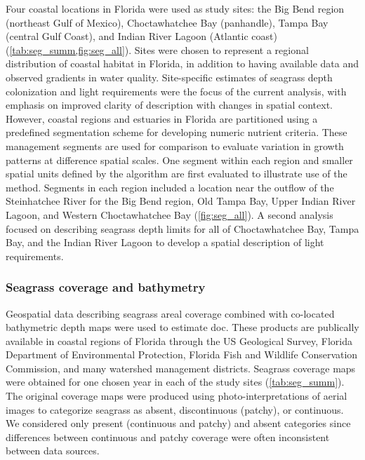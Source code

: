\documentclass[letterpaper,12pt,oneside]{article}\usepackage[]{graphicx}\usepackage[]{color}
\begin{document}
Four coastal locations in Florida were used as study sites: the Big Bend region (northeast Gulf of Mexico), Choctawhatchee Bay (panhandle), Tampa Bay (central Gulf Coast), and Indian River Lagoon (Atlantic coast) (\cref{tab:seg_summ,fig:seg_all}).  Sites were chosen to represent a regional distribution of coastal habitat in Florida, in addition to having available data and observed gradients in water quality. Site-specific estimates of seagrass depth colonization and light requirements were the focus of the current analysis, with emphasis on improved clarity of description with changes in spatial context.  However, coastal regions and estuaries in Florida are partitioned using a predefined segmentation scheme for developing numeric nutrient criteria.  These management segments are used for comparison to evaluate variation in growth patterns at difference spatial scales.  One segment within each region and smaller spatial units defined by the algorithm are first evaluated to illustrate use of the method.  Segments in each region included a location near the outflow of the Steinhatchee River for the Big Bend region, Old Tampa Bay, Upper Indian River Lagoon, and Western Choctawhatchee Bay (\cref{fig:seg_all}).  A second analysis focused on describing seagrass depth limits for all of Choctawhatchee Bay, Tampa Bay, and the Indian River Lagoon to develop a spatial description of light requirements.

\subsubsection{Seagrass coverage and bathymetry} \label{sec:data_srcs}

Geospatial data describing seagrass areal coverage combined with co-located bathymetric depth maps were used to estimate \ac{doc}.  These products are publically available in coastal regions of Florida through the US Geological Survey, Florida Department of Environmental Protection, Florida Fish and Wildlife Conservation Commission, and many watershed management districts.  Seagrass coverage maps were obtained for one chosen year in each of the study sites (\cref{tab:seg_summ}).  The original coverage maps were produced using photo-interpretations of aerial images to categorize seagrass as absent, discontinuous (patchy), or continuous.  We considered only present (continuous and patchy) and absent categories since differences between continuous and patchy coverage were often inconsistent between data sources. 
\end{document}
